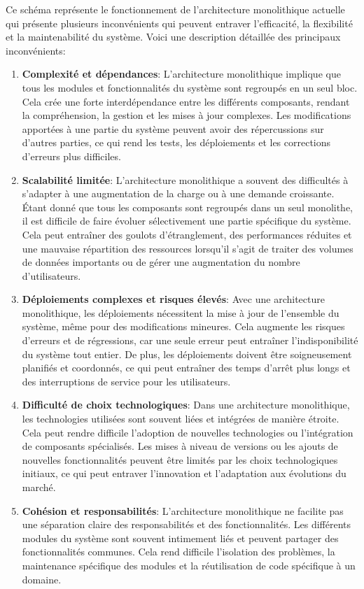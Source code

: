 Ce schéma représente le fonctionnement de l'architecture monolithique actuelle qui présente plusieurs inconvénients qui peuvent entraver l'efficacité, la flexibilité et la maintenabilité du système. Voici une description détaillée des principaux inconvénients:

\begin{enumerate}
    \item \textbf{Complexité et dépendances}: L'architecture monolithique implique que tous les modules et fonctionnalités du système sont regroupés en un seul bloc. Cela crée une forte interdépendance entre les différents composants, rendant la compréhension, la gestion et les mises à jour complexes. Les modifications apportées à une partie du système peuvent avoir des répercussions sur d'autres parties, ce qui rend les tests, les déploiements et les corrections d'erreurs plus difficiles.
    \item \textbf{Scalabilité limitée}: L'architecture monolithique a souvent des difficultés à s'adapter à une augmentation de la charge ou à une demande croissante. Étant donné que tous les composants sont regroupés dans un seul monolithe, il est difficile de faire évoluer sélectivement une partie spécifique du système. Cela peut entraîner des goulots d'étranglement, des performances réduites et une mauvaise répartition des ressources lorsqu'il s'agit de traiter des volumes de données importants ou de gérer une augmentation du nombre d'utilisateurs.
    \item \textbf{Déploiements complexes et risques élevés}: Avec une architecture monolithique, les déploiements nécessitent la mise à jour de l'ensemble du système, même pour des modifications mineures. Cela augmente les risques d'erreurs et de régressions, car une seule erreur peut entraîner l'indisponibilité du système tout entier. De plus, les déploiements doivent être soigneusement planifiés et coordonnés, ce qui peut entraîner des temps d'arrêt plus longs et des interruptions de service pour les utilisateurs.
    \item \textbf{Difficulté de choix technologiques}: Dans une architecture monolithique, les technologies utilisées sont souvent liées et intégrées de manière étroite. Cela peut rendre difficile l'adoption de nouvelles technologies ou l'intégration de composants spécialisés. Les mises à niveau de versions ou les ajouts de nouvelles fonctionnalités peuvent être limités par les choix technologiques initiaux, ce qui peut entraver l'innovation et l'adaptation aux évolutions du marché.
    \item \textbf{Cohésion et responsabilités}: L'architecture monolithique ne facilite pas une séparation claire des responsabilités et des fonctionnalités. Les différents modules du système sont souvent intimement liés et peuvent partager des fonctionnalités communes. Cela rend difficile l'isolation des problèmes, la maintenance spécifique des modules et la réutilisation de code spécifique à un domaine.
\end{enumerate}


